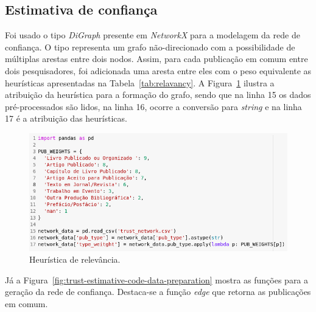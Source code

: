 \documentclass[12pt]{article}
\begin{document}


\subsection{Estimativa de confiança}

Foi usado o tipo \textit{DiGraph} presente em \textit{NetworkX} para a modelagem da rede de confiança. O tipo representa um grafo não-direcionado com a possibilidade de múltiplas arestas entre dois nodos. Assim, para cada publicação em comum entre dois pesquisadores, foi adicionada uma aresta entre eles com o peso equivalente as heurísticas apresentadas na Tabela~\ref{tab:relavancy}. A Figura~\ref{fig:trust-estimative-weights} ilustra a atribuição da heurística para a formação do grafo, sendo que na linha 15 os dados pré-processados são lidos, na linha 16, ocorre a conversão para \textit{string} e na linha 17 é a atribuição das heurísticas.

\begin{figure}[ht]
  \centering
  \includegraphics[width=.85\textwidth]{trustest_pub_weights.png}
  \caption{Heurística de relevância.}
  \label{fig:trust-estimative-weights}
\end{figure}

Já a Figura~\ref{fig:trust-estimative-code-data-preparation} mostra as funções para a geração da rede de confiança. Destaca-se a função \textit{edge} que retorna as publicações em comum.
\end{document}
